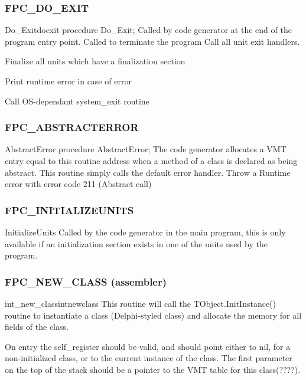 \documentclass [a4paper,12pt]{article}
\begin{document}
\subsubsection{FPC{\_}DO{\_}EXIT}
\label{subsubsec:mylabel78}

\begin{procedurel}{Do{\_}Exit}{doexit}
\Declaration
procedure Do{\_}Exit;
\Description
Called by code generator at the end of the program entry point.
\Notes
Called to terminate the program
\Algorithm
Call all unit exit handlers. \par
Finalize all units which have a finalization section \par
Print runtime error in case of error\par
Call OS-dependant system{\_}exit routine
\end{procedurel}

\subsubsection{FPC{\_}ABSTRACTERROR}
\label{subsubsec:mylabel79}

\begin{function}{AbstractError}
\Declaration
procedure AbstractError;
\Description
The code generator allocates a VMT entry equal to this routine address when
a method of a class is declared as being abstract. This routine simply calls
the default error handler.
\Algorithm
Throw a Runtime error with error code 211 (Abstract call)
\end{function}

\subsubsection{FPC{\_}INITIALIZEUNITS}
\label{subsubsec:mylabel80}

\begin{function}{InitializeUnits}
\Declaration
\Description
Called by the code generator in the main program, this is only available if
an \textsf{initialization} section exists in one of the units used by the
program.
\end{function}

\subsubsection{FPC{\_}NEW{\_}CLASS (assembler)}
\label{subsubsec:mylabel81}

\begin{procedurel}{int{\_}new{\_}class}{intnewclass}
\Description
This routine will call the TObject.InitInstance() routine to
instantiate a class (Delphi-styled class) and allocate the memory for all
fields of the class.

On entry the self{\_}register should be valid, and should point either to
nil, for a non-initialized class, or to the current instance of the class.
The first parameter on the top of the stack should be a pointer to the VMT
table for this class(????).
\end{procedurel}
\end{document}
